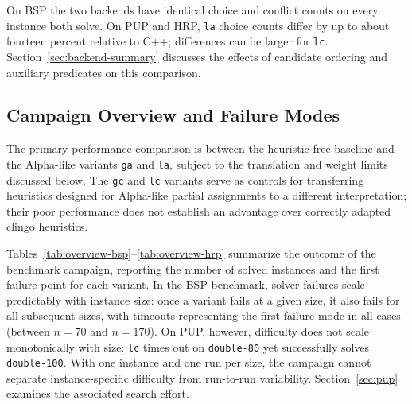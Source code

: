 On BSP the two backends have identical choice and conflict counts on every instance both solve. On PUP and HRP, \texttt{la} choice counts differ by up to about fourteen percent relative to C++; differences can be larger for \texttt{lc}. Section~\ref{sec:backend-summary} discusses the effects of candidate ordering and auxiliary predicates on this comparison.

\subsection{Campaign Overview and Failure Modes}
\label{sec:campaign-overview}

The primary performance comparison is between the heuristic-free baseline and the Alpha-like variants \texttt{ga} and \texttt{la}, subject to the translation and weight limits discussed below. The \texttt{gc} and \texttt{lc} variants serve as controls for transferring heuristics designed for Alpha-like partial assignments to a different interpretation; their poor performance does not establish an advantage over correctly adapted clingo heuristics.

Tables~\ref{tab:overview-bsp}--\ref{tab:overview-hrp} summarize the outcome of the benchmark campaign, reporting the number of solved instances and the first failure point for each variant.
In the BSP benchmark, solver failures scale predictably with instance size: once a variant fails at a given size, it also fails for all subsequent sizes, with timeouts representing the first failure mode in all cases (between $n=70$ and $n=170$). On PUP, however, difficulty does not scale monotonically with size: \texttt{lc} times out on \texttt{double-80} yet successfully solves \texttt{double-100}. With one instance and one run per size, the campaign cannot separate instance-specific difficulty from run-to-run variability. Section~\ref{sec:pup} examines the associated search effort.

